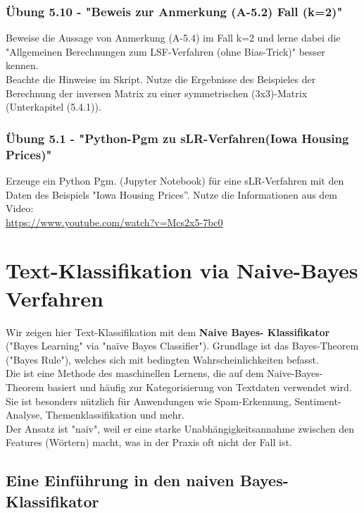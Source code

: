 \documentclass[12pt]{article}
\begin{document}
\subsubsection{Übung 5.10 - "Beweis zur Anmerkung (A-5.2) Fall (k=2)"}
%
Beweise die Aussage von Anmerkung (A-5.4) im Fall k=2 und lerne dabei die "Allgemeinen Berechnungen zum LSF-Verfahren (ohne Bias-Trick)" besser kennen. \\ Beachte die Hinweise im Skript. Nutze die Ergebnisse des Beispieles der Berechnung der inversen Matrix zu einer symmetrischen (3x3)-Matrix (Unterkapitel (5.4.1)).

\subsubsection{Übung 5.1 - "Python-Pgm zu sLR-Verfahren(Iowa Housing Prices)"}
%
Erzeuge ein Python Pgm. (Jupyter Notebook) für eine sLR-Verfahren mit den Daten des Beispiels "Iowa Housing Prices”. Nutze die Informationen aus dem Video:\\
\url{https://www.youtube.com/watch?v=Mcs2x5-7bc0}\\ 

\newpage

\section{Text-Klassifikation via Naive-Bayes Verfahren \\}


Wir zeigen hier Text-Klassifikation mit dem \textbf{Naive Bayes- Klassifikator} ("Bayes Learning" via "naïve Bayes Classifier"). Grundlage ist das Bayes-Theorem ("Bayes Rule"), welches sich mit bedingten Wahrscheinlichkeiten befasst.\\
Die {\color{blue}{Naive-Bayes-Textklassifikation}}  ist eine Methode des maschinellen Lernens, die auf dem Naive-Bayes-Theorem basiert und häufig zur Kategorisierung von Textdaten verwendet wird. Sie ist besonders nützlich für Anwendungen wie Spam-Erkennung, Sentiment-Analyse, Themenklassifikation und mehr.\\

Der Ansatz ist "naiv", weil er eine starke Unabhängigkeitsannahme zwischen den Features (Wörtern) macht, was in der Praxis oft nicht der Fall ist.

\subsection{Eine Einführung in den naiven Bayes-Klassifikator}
\end{document}
